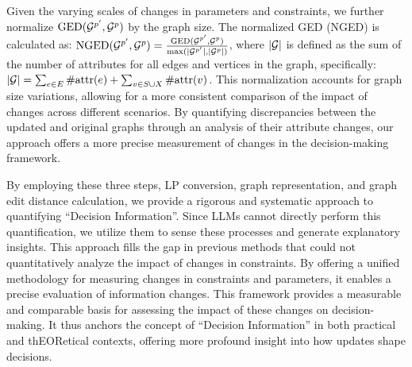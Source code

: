 Given the varying scales of changes in parameters and constraints, we further normalize $\text{GED}({\mathcal{G}}^{p'}, {\mathcal{G}}^p)$ by the graph size. The normalized GED (NGED) is calculated as: $\text{NGED}({\mathcal{G}}^{p'}, {\mathcal{G}}^p)=\frac{\text{GED}({\mathcal{G}}^{p'}, {\mathcal{G}}^p)}{\max(|{\mathcal{G}}^{p'}|, |{\mathcal{G}}^{p}|)}$, where $|{\mathcal{G}}|$ is defined as the sum of the number of attributes for all edges and vertices in the graph, specifically: $|{\mathcal{G}}| = \sum_{e \in E}\text{\#attr}(e) + \sum_{v \in S \cup X}\text{\#attr}(v)$. This normalization accounts for graph size variations, allowing for a more consistent comparison of the impact of changes across different scenarios. By quantifying discrepancies between the updated and original graphs through an analysis of their attribute changes, our approach offers a more precise measurement of changes in the decision-making framework.

By employing these three steps, LP conversion, graph representation, and graph edit distance calculation, we provide a rigorous and systematic approach to quantifying ``Decision Information''. Since LLMs cannot directly perform this quantification, we utilize them to sense these processes and generate explanatory insights. This approach fills the gap in previous methods that could not quantitatively analyze the impact of changes in constraints. By offering a unified methodology for measuring changes in constraints and parameters, it enables a precise evaluation of information changes. This framework provides a measurable and comparable basis for assessing the impact of these changes on decision-making. It thus anchors the concept of ``Decision Information'' in both practical and thEORetical contexts, offering more profound insight into how updates shape decisions.
